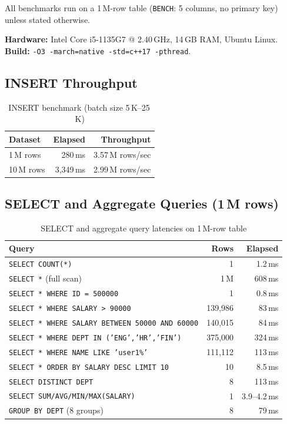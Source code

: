 \documentclass[12pt,a4paper]{article}
\begin{document}
All benchmarks run on a 1\,M-row table (\texttt{BENCH}: 5 columns, no primary key)
unless stated otherwise.

\noindent\textbf{Hardware:} Intel Core i5-1135G7 @ 2.40\,GHz, 14\,GB RAM, Ubuntu Linux.\\
\textbf{Build:} \texttt{-O3 -march=native -std=c++17 -pthread}.

\subsection{INSERT Throughput}

\begin{table}[H]
\centering
\begin{tabular}{lrr}
\toprule
\textbf{Dataset} & \textbf{Elapsed} & \textbf{Throughput} \\
\midrule
1\,M rows  & 280\,ms   & 3.57\,M rows/sec \\
10\,M rows & 3,349\,ms & 2.99\,M rows/sec \\
\bottomrule
\end{tabular}
\caption{INSERT benchmark (batch size 5\,K--25\,K)}
\end{table}

\subsection{SELECT and Aggregate Queries (1\,M rows)}

\begin{table}[H]
\centering
\begin{tabular}{L{9cm} r r}
\toprule
\textbf{Query} & \textbf{Rows} & \textbf{Elapsed} \\
\midrule
\texttt{SELECT COUNT(*)}                                     & 1       & 1.2\,ms  \\
\texttt{SELECT *} (full scan)                                & 1\,M    & 608\,ms  \\
\texttt{SELECT * WHERE ID = 500000}                          & 1       & 0.8\,ms  \\
\texttt{SELECT * WHERE SALARY > 90000}                       & 139,986 & 83\,ms   \\
\texttt{SELECT * WHERE SALARY BETWEEN 50000 AND 60000}       & 140,015 & 84\,ms   \\
\texttt{SELECT * WHERE DEPT IN ('ENG','HR','FIN')}           & 375,000 & 324\,ms  \\
\texttt{SELECT * WHERE NAME LIKE 'user1\%'}                  & 111,112 & 113\,ms  \\
\texttt{SELECT * ORDER BY SALARY DESC LIMIT 10}              & 10      & 8.5\,ms  \\
\texttt{SELECT DISTINCT DEPT}                                & 8       & 113\,ms  \\
\texttt{SELECT SUM/AVG/MIN/MAX(SALARY)}                      & 1       & 3.9--4.2\,ms \\
\texttt{GROUP BY DEPT} (8 groups)                            & 8       & 79\,ms   \\
\bottomrule
\end{tabular}
\caption{SELECT and aggregate query latencies on 1\,M-row table}
\end{table}
\end{document}
